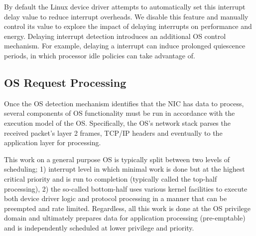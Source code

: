 By default the Linux device driver attempts to automatically set this interrupt delay value to reduce interrupt overheads.  We disable this feature and manually control its value to explore the impact of delaying interrupts on performance and energy. Delaying interrupt detection introduces an additional OS control mechanism. For example, delaying a interrupt can induce prolonged quiescence periods, in which processor idle policies can take advantage of.




\subsection{OS Request Processing}
\label{sec:workflow:osreqproc}

Once the OS detection mechanism identifies that the NIC has data to process, several components of OS functionality must be run in accordance with the execution model of the OS. Specifically, the OS's network stack parses the received packet's layer 2 frames, TCP/IP headers and eventually to the application layer for processing. %


This work on a general purpose OS is typically split between two levels of scheduling; 1) interrupt level in which minimal work is done but at the highest critical priority and is run to completion (typically called the top-half processing), 2) the so-called bottom-half uses various kernel facilities to execute both device driver logic and protocol processing in a manner that can be preempted and rate limited.  Regardless, all this work is done at the OS privilege domain and ultimately prepares data for application processing (pre-emptable) and is independently scheduled at lower privilege and priority. %

